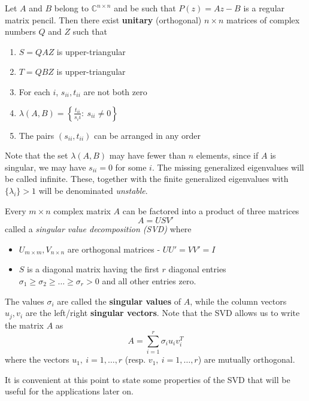 \documentclass[a4paper,10pt]{article}  %
\begin{document}
\begin{theorem}
Let $A$ and $B$ belong to $ \mathbb{C}^{n\times n} $ and be such that $ P(z) = Az - B$ is a regular matrix pencil. Then
there exist \textbf{unitary} (orthogonal) $n\times n$ matrices of complex numbers $Q$ and $Z$ such that
\begin{enumerate}
   
   \item $ S = Q A Z $ is upper-triangular
   \item $ T = Q B Z $ is upper-triangular
   \item For each $ i $, $ s_{ii},t_{ii}$ are not both zero
   \item $ \lambda(A,B) = \left\{ \frac{t_{ii}}{s_ii} : \ s_{ii}\ne 0 \right\}$
   \item The pairs $ (s_{ii}, t_{ii} ) $ can be arranged in any order
\end{enumerate}
Note that the set $ \lambda(A,B) $ may have fewer than $ n $ elements, since if $ A $ is singular, we may have $
s_{ii}=0 $ for some $ i $. The missing generalized eigenvalues will be called infinite. These, together with the finite
generalized eigenvalues with $ \{\lambda_i \} >1$ will be denominated \emph{unstable}. 
\end{theorem}

\begin{theorem}
   Every $m\times n $ complex matrix $ A $ can be factored into a product of three matrices
   \begin{equation}
      \label{eq:SVD}
      A = U S V'
   \end{equation}
   called a \emph{singular value decomposition (SVD)} where \\[-1.5\baselineskip]
   \begin{itemize}[label=\raisebox{0.25ex}{\tiny $\bullet$ }]
      \item $ U _{m\times m}, V_{n\times n}$ are orthogonal matrices - $ UU' = VV' = I $
      \item $ S $ is a diagonal matrix having the first $r$ diagonal entries $ \sigma_1 \ge \sigma_2 \ge \ldots \ge \sigma_{r} > 0$
      and all other entries zero. \\[-1.5\baselineskip]
   \end{itemize}
   The values $ \sigma_i $ are called the \textbf{singular values} of $ A $, while the column vectors $ u_j,v_i $ are
   the left/right \textbf{singular vectors}. Note that the SVD allows us to write the matrix $ A $ as 
   \[
      A = \sum_{i=1}^r \sigma_i u_i v_i^T
   \]
   where the vectors $ u_1, \ i=1,\ldots,r $ (resp. $ v_1, \ i=1,\ldots,r $) are mutually orthogonal. 
\end{theorem}
It is convenient at this point to state  some properties of the SVD that will be useful for the applications later on. 
\pagebreak 
\end{document}
